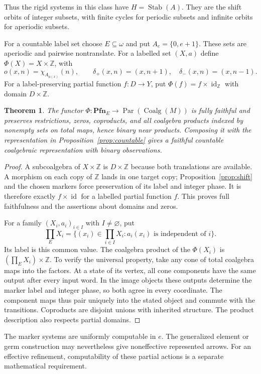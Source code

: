 \documentclass[11pt]{article}
\newtheorem{theorem}{Theorem}[section]
\theoremstyle{definition}
\newcommand{\N}{\omega}
\newcommand{\Z}{\mathbb Z}
\newcommand{\Pfn}{\mathbf{Pfn}}
\newcommand{\Par}{\operatorname{Par}}
\newcommand{\Coalg}{\operatorname{Coalg}}
\newcommand{\id}{\operatorname{id}}
\begin{document}
Thus the rigid systems in this class have $H=\operatorname{Stab}(A)$.
They are the shift orbits of integer subsets, with finite cycles for
periodic subsets and infinite orbits for aperiodic subsets.

For a countable label set choose $E\subseteq\N$ and put
$A_e=\{0,e+1\}$. These sets are aperiodic and pairwise nontranslate.
For a labelled set $(X,a)$ define $\Phi(X)=X\times\Z$, with
\[
 o(x,n)=\chi_{A_{a(x)}}(n),\qquad
 \delta_+(x,n)=(x,n+1),\quad \delta_-(x,n)=(x,n-1).
\]
For a label-preserving partial function $f:D\to Y$, put
$\Phi(f)=f\times\id_{\Z}$ with domain $D\times\Z$.

\begin{theorem}\label{thm:integer}
The functor
$\Phi:\Pfn_E\to\Par(\Coalg(M))$ is fully faithful and preserves
restrictions, zeros, coproducts, and all coalgebra products indexed
by nonempty sets on total maps, hence binary near products. Composing it with the
representation in Proposition~\ref{prop:countable} gives a faithful
countable coalgebraic representation with binary observations.
\end{theorem}
\begin{proof}
A subcoalgebra of $X\times\Z$ is $D\times\Z$ because both
translations are available. A morphism on each copy of $\Z$ lands
in one target copy; Proposition~\ref{prop:shift} and the chosen
markers force preservation of its label and integer phase. It is
therefore exactly $f\times\id$ for a labelled partial function $f$.
This proves full faithfulness and the assertions about domains and zeros.

For a family $(X_i,a_i)_{i\in I}$ with $I\ne\varnothing$, put
\[
 \prod_E X_i=\{(x_i)\in\prod_{i\in I}X_i:
                     a_i(x_i)\text{ is independent of }i\}.
\]
Its label is this common value. The coalgebra product of the
$\Phi(X_i)$ is $(\prod_E X_i)\times\Z$. To verify the universal property, take
any cone of total coalgebra maps into the factors. At a state of its
vertex, all cone components have the same output after every input
word. In the image objects these outputs determine the marker label
and integer phase, so both agree in every coordinate. The component
maps thus pair uniquely into the stated object and commute with the
transitions. Coproducts are disjoint unions with inherited structure.
The product description also respects partial domains.
\end{proof}

The marker systems are uniformly computable in $e$. The generalized
element or germ construction may nevertheless give noneffective
represented arrows. For an effective refinement, computability of
these partial actions is a separate mathematical requirement.
\end{document}
